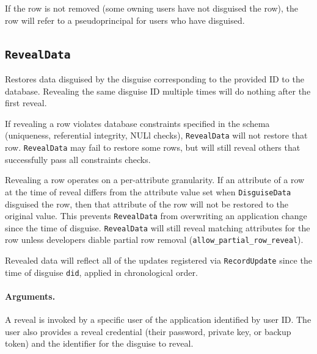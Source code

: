     If the row is not removed (some owning users have not disguised the row),
    the row will refer to a pseudoprincipal for users who have disguised.

\subsection{\texttt{RevealData}}


    Restores data disguised by the disguise corresponding to the provided ID to
    the database. Revealing the same disguise ID multiple times will do nothing
    after the first reveal.

    If revealing a row violates database constraints specified in the schema
    (\eg uniqueness, referential integrity, NULl checks), \texttt{RevealData}
    will not restore that row.  \texttt{RevealData} may fail to restore some
    rows, but will still reveal others that successfully pass all constraints
    checks.

    Revealing a row operates on a per-attribute granularity. If an attribute of
    a row at the time of reveal differs from the attribute value set when
    \texttt{DisguiseData} disguised the row, then that attribute of the row will
    not be restored to the original value. This prevents \texttt{RevealData}
    from overwriting an application change since the time of disguise. 
    \texttt{RevealData} will still reveal matching attributes for the row unless
    developers diable partial row removal
    (\texttt{allow\_partial\_row\_reveal}).

    Revealed data will reflect all of the updates registered via
    \texttt{RecordUpdate} since the time of disguise \texttt{did}, applied in
    chronological order.

    \paragraph{Arguments.} 
    A reveal is invoked by a specific
    user of the application identified by user ID. 
    The user also provides a reveal
    credential (their password, private key, or backup token) and the 
    identifier for the disguise to reveal.

